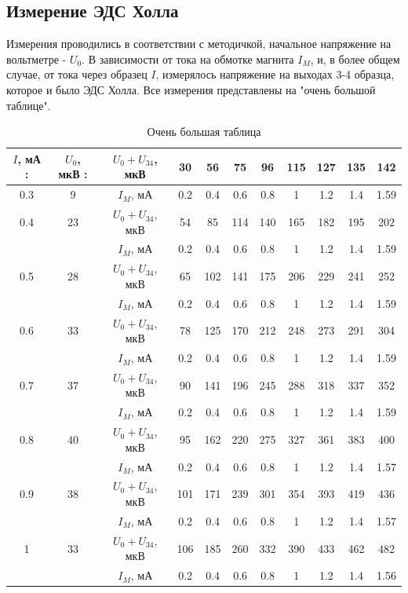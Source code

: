 \documentclass[a4paper, 14pt]{extarticle}%
\newcommand\ECaption[1]{%
     \captionsetup{font=footnotesize}%
     \caption{#1}}
\begin{document}
\subsection*{Измерение ЭДС Холла}
Измерения проводились в соответствии с методичкой, начальное напряжение на вольтметре - $U_0$. В зависимости от тока на обмотке магнита $I_M$, и, в более общем случае, от тока через образец $I$, измерялось напряжение на выходах 3-4 образца, которое и было ЭДС Холла. Все измерения представлены на "очень большой таблице".
\begin{table}[h!]
\begin{tabular}{|c|c|c|c|c|c|c|c|c|c|c|}
\hline
\rowcolor[HTML]{FFFFC7} 
$I$, мА : & $U_0$, мкВ : & $U_0+U_{34}$, мкВ & 30  & 56  & 75  & 96  & 115 & 127 & 135 & 142  \\ \hline
0.3       & 9            & $I_M$, мА          & 0.2 & 0.4 & 0.6 & 0.8 & 1   & 1.2 & 1.4 & 1.59 \\ \hline
\rowcolor[HTML]{FFFFC7} 
0.4       & 23           & $U_0+U_{34}$, мкВ & 54  & 85  & 114 & 140 & 165 & 182 & 195 & 202  \\ \hline
          &              & $I_M$, мА          & 0.2 & 0.4 & 0.6 & 0.8 & 1   & 1.2 & 1.4 & 1.59 \\ \hline
\rowcolor[HTML]{FFFFC7} 
0.5       & 28           & $U_0+U_{34}$, мкВ & 65  & 102 & 141 & 175 & 206 & 229 & 241 & 252  \\ \hline
          &              & $I_M$, мА          & 0.2 & 0.4 & 0.6 & 0.8 & 1   & 1.2 & 1.4 & 1.59 \\ \hline
\rowcolor[HTML]{FFFFC7} 
0.6       & 33           & $U_0+U_{34}$, мкВ & 78  & 125 & 170 & 212 & 248 & 273 & 291 & 304  \\ \hline
          &              & $I_M$, мА          & 0.2 & 0.4 & 0.6 & 0.8 & 1   & 1.2 & 1.4 & 1.59 \\ \hline
\rowcolor[HTML]{FFFFC7} 
0.7       & 37           & $U_0+U_{34}$, мкВ & 90  & 141 & 196 & 245 & 288 & 318 & 337 & 352  \\ \hline
          &              & $I_M$, мА          & 0.2 & 0.4 & 0.6 & 0.8 & 1   & 1.2 & 1.4 & 1.59 \\ \hline
\rowcolor[HTML]{FFFFC7} 
0.8       & 40           & $U_0+U_{34}$, мкВ & 95  & 162 & 220 & 275 & 327 & 361 & 383 & 400  \\ \hline
          &              & $I_M$, мА          & 0.2 & 0.4 & 0.6 & 0.8 & 1   & 1.2 & 1.4 & 1.57 \\ \hline
\rowcolor[HTML]{FFFFC7} 
0.9       & 38           & $U_0+U_{34}$, мкВ & 101 & 171 & 239 & 301 & 354 & 393 & 419 & 436  \\ \hline
          &              & $I_M$, мА          & 0.2 & 0.4 & 0.6 & 0.8 & 1   & 1.2 & 1.4 & 1.57 \\ \hline
\rowcolor[HTML]{FFFFC7} 
1         & 33           & $U_0+U_{34}$, мкВ & 106 & 185 & 260 & 332 & 390 & 433 & 462 & 482  \\ \hline
          &              & $I_M$, мА          & 0.2 & 0.4 & 0.6 & 0.8 & 1   & 1.2 & 1.4 & 1.56 \\ \hline
\end{tabular}
\ECaption{Очень большая таблица}
\end{table}
\end{document}
